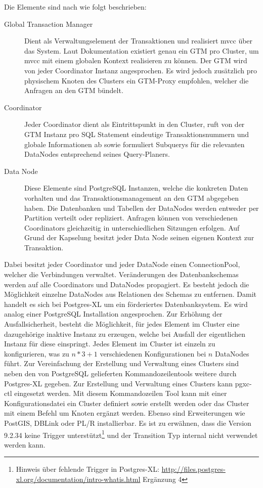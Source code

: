Die Elemente sind nach \cite{website:postgresxl-about} wie folgt beschrieben:
\begin{description}
\item[Global Transaction Manager] Dient als Verwaltungselement der Transaktionen und realisiert \Gls{mvcc} über das System. Laut Dokumentation existiert genau ein GTM pro Cluster, um \Gls{mvcc}  mit einem globalen Kontext realisieren zu können. Der GTM wird von jeder Coordinator Instanz angesprochen. Es wird jedoch zusätzlich pro physischem Knoten des Clusters ein GTM-Proxy empfohlen, welcher die Anfragen an den GTM bündelt.
\item[Coordinator] Jeder Coordinator dient als Eintrittspunkt in den Cluster, ruft von der GTM Instanz pro SQL Statement eindeutige Transaktionsnummern und globale Informationen ab sowie formuliert Subquerys für die relevanten DataNodes entsprechend seines Query-Planers.
\item[Data Node] Diese Elemente sind PostgreSQL Instanzen, welche die konkreten Daten vorhalten und das Transaktionsmanagement an den GTM abgegeben haben. Die Datenbanken und Tabellen der DataNodes werden entweder per Partition verteilt oder repliziert. Anfragen können von verschiedenen Coordinators gleichzeitig in unterschiedlichen Sitzungen erfolgen. Auf Grund der Kapselung besitzt jeder Data Node seinen eigenen Kontext zur Transaktion.
\end{description}
Dabei besitzt jeder Coordinator und jeder DataNode einen ConnectionPool, welcher die Verbindungen verwaltet.
Veränderungen des Datenbankschemas werden auf alle Coordinators und DataNodes propagiert.
Es besteht jedoch die Möglichkeit einzelne DataNodes aus Relationen des Schemas zu entfernen.
Damit handelt es sich bei Postgres-XL um ein förderiertes Datenbanksystem.
Es wird analog einer PostgreSQL Installation angesprochen.
Zur Erhöhung der Ausfallsicherheit, besteht die Möglichkeit, für jedes Element im Cluster eine dazugehörige inaktive Instanz zu erzeugen, welche bei Ausfall der eigentlichen Instanz für diese einspringt.
Jedes Element im Cluster ist einzeln zu konfigurieren, was zu $ n*3+1 $ verschiedenen Konfigurationen bei $n$ DataNodes führt.
Zur Vereinfachung der Erstellung und Verwaltung eines Clusters sind neben den von PostgreSQL gelieferten Kommandozeilentools weitere durch Postgres-XL gegeben.
Zur Erstellung und Verwaltung eines Clusters kann pgxc-ctl eingesetzt werden.
Mit diesem Kommandozeilen Tool kann mit einer Konfigurationsdatei ein Cluster definiert sowie erstellt werden oder das Cluster mit einem Befehl um Knoten ergänzt werden.
Ebenso sind Erweiterungen wie PostGIS, DBLink oder PL/R installierbar.
Es ist zu erwähnen, dass die Version 9.2.34 keine Trigger unterstützt\footnote{Hinweis über fehlende Trigger in Postgres-XL: \url{http://files.postgres-xl.org/documentation/intro-whatis.html} Ergänzung 4} und der Transition Typ internal nicht verwendet werden kann.

